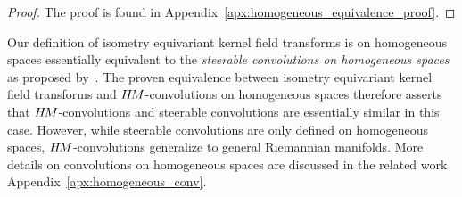 \begin{proof}
    The proof is found in Appendix~\ref{apx:homogeneous_equivalence_proof}.
\end{proof}
Our definition of isometry equivariant kernel field transforms is on homogeneous spaces essentially equivalent to the \emph{steerable convolutions on homogeneous spaces} as proposed by~\citet{Cohen2018-intertwiners}\cite{Cohen2019-generaltheory}.
The proven equivalence between isometry equivariant kernel field transforms and $H\mkern-2.5muM$-convolutions on homogeneous spaces therefore asserts that $H\mkern-2.5muM$-convolutions and steerable convolutions are essentially similar in this case.
However, while steerable convolutions are only defined on homogeneous spaces, $H\mkern-2.5muM$-convolutions generalize to general Riemannian manifolds.
More details on convolutions on homogeneous spaces are discussed in the related work Appendix~\ref{apx:homogeneous_conv}.

